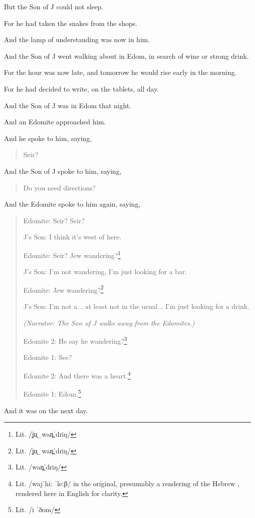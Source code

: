 
{ \hX{} }
{ \eX{} }
{ But the Son of J could not sleep.

  For he had taken the snakes from the shops.

  And the lamp of understanding was now in him. }

{ \hX{} }
{ \eX{} }
{ And the Son of J went walking about in Edom, in search of wine or strong drink.

  For the hour was now late, and tomorrow he would rise early in the morning.

  For he had decided to write, on the tablets, all day. }

{ \hX{} }
{ \eX{} }
{ And the Son of J was in Edom that night.

  And an Edomite approached him.

  And he spoke to him, saying,
  \begin{quote}Seir?\end{quote}
  And the Son of J spoke to him, saying,
  \begin{quote}Do you need directions?\end{quote} }

{ \hX{} }
{ \eX{} }
{ And the Edomite spoke to him again, saying,
  \begin{quote}
    Edomite: Seir? Seir?

    J's Son: I think it's west of here.

    Edomite: Seir? Jew wandering?\footnote{Lit. /ʝu̞‿wan̪ˈdɾiŋ/}

    J's Son: I'm not wandering, I'm just looking for a bar.

    Edomite: Jew wandering?\footnote{Lit. /ʝu̞‿wan̪ˈdɾiŋ/}

    J's Son: I'm not a... at least not in the usual...  I'm just looking for a drink.

    \textsl{(Narrator: The Son of J walks away from the Edomites.)}

    Edomite 2: He say he wandering?\footnote{Lit. /wan̪ˈdɾiŋ/}

    Edomite 1: See?

    Edomite 2: And there was a heart.\footnote{Lit. /wajˈhiː ˈleːβ/ in the original, presumably a rendering of the Hebrew , rendered here in English for clarity.}

    Edomite 1: Edom.\footnote{Lit. /i ˈðom/}
  \end{quote} }

{ \hX{} }
{ \eX{} }
{ And it was on the next day. }
